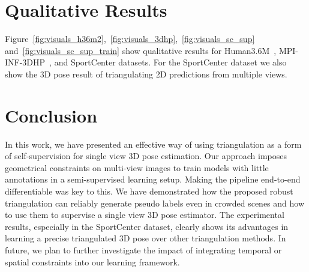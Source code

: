 \documentclass[runningheads]{llncs}
\begin{document}
 




\section*{Qualitative Results}
Figure~\ref{fig:visuals_h36m2},~\ref{fig:visuals_3dhp},~\ref{fig:visuals_sc_sup} and~\ref{fig:visuals_sc_sup_train} show qualitative results for Human3.6M~\cite{Ionescu14a},  MPI-INF-3DHP~\cite{Mehta17a}, and SportCenter datasets. For the SportCenter dataset we also show the 3D pose result of triangulating 2D predictions from multiple views.


%
 \section{Conclusion}
\label{sec:conclusion}

In this work, we have presented an effective way of using triangulation as a form of self-supervision for single view 3D pose estimation. Our approach imposes geometrical constraints on multi-view images to train models with little annotations in a semi-supervised learning setup. Making the pipeline end-to-end differentiable was key to this. We have demonstrated how the proposed robust triangulation can reliably generate pseudo labels even in crowded scenes and how to use them to supervise a single view 3D pose estimator. The experimental results, especially in the SportCenter dataset, clearly shows its advantages in learning a precise triangulated 3D pose over other triangulation methods. In future, we plan to further investigate the impact of integrating temporal or spatial constraints into our learning framework. 

\end{document}
